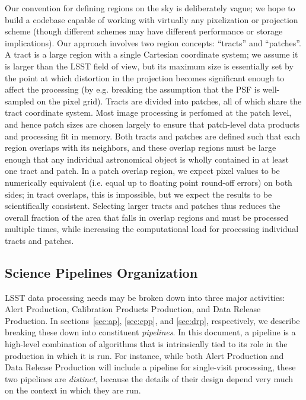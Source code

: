 Our convention for defining regions on the sky is deliberately vague; we hope to build a codebase capable of working with virtually any pixelization or projection scheme (though different schemes may have different performance or storage implications).  Our approach involves two region concepts: ``tracts'' and ``patches''.  A tract is a large region with a single Cartesian coordinate system; we assume it is larger than the LSST field of view, but its maximum size is essentially set by the point at which distortion in the projection becomes significant enough to affect the processing (by e.g. breaking the assumption that the PSF is well-sampled on the pixel grid).  Tracts are divided into patches, all of which share the tract coordinate system.  Most image processing is perfomed at the patch level, and hence patch sizes are chosen largely to ensure that patch-level data products and processing fit in memory.  Both tracts and patches are defined such that each region overlaps with its neighbors, and these overlap regions must be large enough that any individual astronomical object is wholly contained in at least one tract and patch.  In a patch overlap region, we expect pixel values to be numerically equivalent (i.e. equal up to floating point round-off errors) on both sides; in tract overlaps, this is impossible, but we expect the results to be scientifically consistent.  Selecting larger tracts and patches thus reduces the overall fraction of the area that falls in overlap regions and must be processed multiple times, while increasing the computational load for processing individual tracts and patches.

\subsection{Science Pipelines Organization}

LSST data processing needs may be broken down into three major activities: Alert Production, Calibration Products Production, and Data Release Production. In sections~\ref{sec:ap}, \ref{sec:cpp}, and \ref{sec:drp}, respectively, we describe breaking these down into constituent \emph{pipelines}.  In this document, a pipeline is a high-level combination of algorithms that is intrinsically tied to its role in the production in which it is run.  For instance, while both Alert Production and Data Release Production will include a pipeline for single-visit processing, these two pipelines are \emph{distinct}, because the details of their design depend very much on the context in which they are run.


